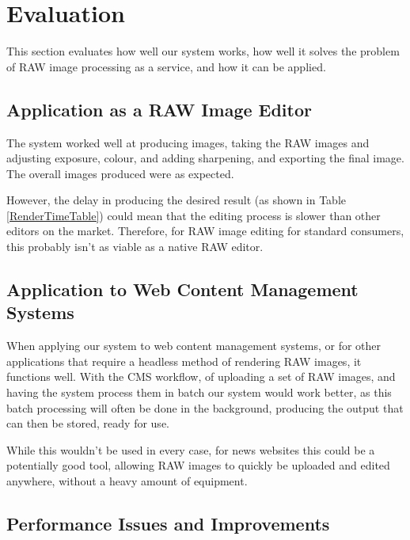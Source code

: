 \documentclass[10pt,a4paper]{article}
\begin{document}
\section{Evaluation}
This section evaluates how well our system works, how well it solves the problem of RAW image processing as a service,
and how it can be applied.

\subsection{Application as a RAW Image Editor}
The system worked well at producing images, taking the RAW images and adjusting exposure, colour, and adding sharpening, and exporting the final image.
The overall images produced were as expected.

However, the delay in producing the desired result (as shown in Table \ref{RenderTimeTable}) could mean that the editing process is slower
than other editors on the market. Therefore, for RAW image editing for standard consumers, this probably isn't as viable as a native RAW editor.

\subsection{Application to Web Content Management Systems}
When applying our system to web content management systems, or for other applications that require a headless method
of rendering RAW images, it functions well. With the CMS workflow, of uploading a set of RAW images, and having the system
process them in batch our system would work better, as this batch processing will often be done in the background, producing
the output that can then be stored, ready for use.

While this wouldn't be used in every case, for news websites this could be a potentially good tool, allowing RAW images to quickly be uploaded 
and edited anywhere, without a heavy amount of equipment. 

\subsection{Performance Issues and Improvements}
\end{document}
